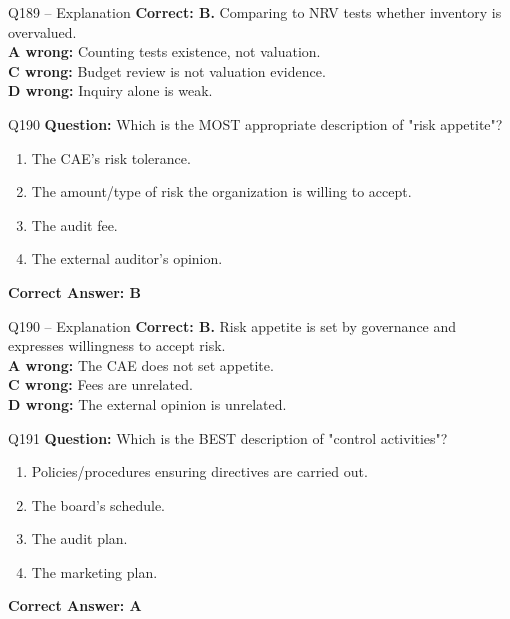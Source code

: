 \documentclass[aspectratio=169,10pt]{beamer}
\begin{document}
	\begin{frame}[t]{Q189 -- Explanation}
		\small
		\textbf{Correct: B.} Comparing to NRV tests whether inventory is overvalued. \\[4pt]
		\textbf{A wrong:} Counting tests existence, not valuation. \\[2pt]
		\textbf{C wrong:} Budget review is not valuation evidence. \\[2pt]
		\textbf{D wrong:} Inquiry alone is weak.
	\end{frame}
	
	\begin{frame}[t]{Q190}
		\small
		\textbf{Question:} Which is the MOST appropriate description of "risk appetite"?
		\begin{enumerate}[label=\Alph*.,itemsep=1pt,topsep=2pt]
			\item The CAE's risk tolerance.
			\item The amount/type of risk the organization is willing to accept.
			\item The audit fee.
			\item The external auditor's opinion.
		\end{enumerate}
		\vspace{4pt}
		\textbf{Correct Answer: B}
	\end{frame}
	
	\begin{frame}[t]{Q190 -- Explanation}
		\small
		\textbf{Correct: B.} Risk appetite is set by governance and expresses willingness to accept risk. \\[4pt]
		\textbf{A wrong:} The CAE does not set appetite. \\[2pt]
		\textbf{C wrong:} Fees are unrelated. \\[2pt]
		\textbf{D wrong:} The external opinion is unrelated.
	\end{frame}
	
	\begin{frame}[t]{Q191}
		\small
		\textbf{Question:} Which is the BEST description of "control activities"?
		\begin{enumerate}[label=\Alph*.,itemsep=1pt,topsep=2pt]
			\item Policies/procedures ensuring directives are carried out.
			\item The board's schedule.
			\item The audit plan.
			\item The marketing plan.
		\end{enumerate}
		\vspace{4pt}
		\textbf{Correct Answer: A}
	\end{frame}
	
\end{document}
